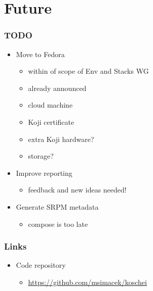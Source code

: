 \documentclass[pdftex,unicode,xcolor=table]{beamer}
\begin{document}
\section{Future}
\begin{frame}
  \frametitle{TODO}
  \begin{itemize}
    \item Move to Fedora
    \begin{itemize}
      \item within of scope of Env and Stacks WG
      \item already announced
      \item cloud machine
      \item Koji certificate
      \item extra Koji hardware?
      \item storage?
    \end{itemize}
    \item Improve reporting
    \begin{itemize}
      \item feedback and new ideas needed!
    \end{itemize}
    \item Generate SRPM metadata
    \begin{itemize}
      \item compose is too late
    \end{itemize}
  \end{itemize}
\end{frame}

\begin{frame}
  \frametitle{Links}
  \begin{itemize}
    \item Code repository
    \begin{itemize}
      \item \url{https://github.com/msimacek/koschei}
    \end{itemize}
  \end{itemize}
\end{frame}


 {
  \Rhbg{\frame{\theend}}
}
\end{document}
